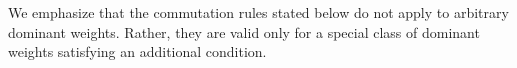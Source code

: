 We emphasize that the commutation rules stated below do not apply to arbitrary dominant weights. Rather, they are valid only for a special class of dominant weights satisfying an additional condition.








